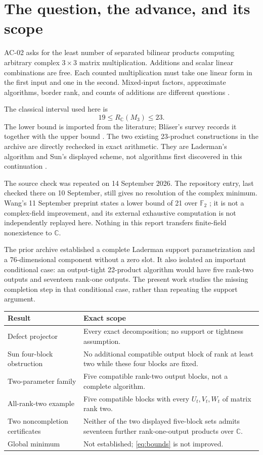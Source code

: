 \documentclass[11pt]{article}
\theoremstyle{definition}\newtheorem{definition}[theorem]{Definition}
\newcommand{\C}{\mathbb C}\newcommand{\Q}{\mathbb Q}
\begin{document}
\section{The question, the advance, and its scope}
AC-02 asks for the least number of separated bilinear products computing arbitrary complex $3\times3$ matrix multiplication. Additions and scalar linear combinations are free. Each counted multiplication must take one linear form in the first input and one in the second. Mixed-input factors, approximate algorithms, border rank, and counts of additions are different questions \cite{repo}.

The classical interval used here is
\begin{equation}\label{eq:bounds}
19\le R_{\C}(M_3)\le23.
\end{equation}
The lower bound is imported from the literature; Bl\"aser's survey records it together with the upper bound \cite{blaeser}. The two existing 23-product constructions in the archive are directly rechecked in exact arithmetic. They are Laderman's algorithm and Sun's displayed scheme, not algorithms first discovered in this continuation \cite{laderman,sun}.

The source check was repeated on 14 September 2026. The repository entry, last checked there on 10 September, still gives no resolution of the complex minimum. Wang's 11 September preprint states a lower bound of 21 over $\mathbb F_2$ \cite{wang21}; it is not a complex-field improvement, and its external exhaustive computation is not independently replayed here. Nothing in this report transfers finite-field nonexistence to $\C$.

The prior archive established a complete Laderman support parametrization and a 76-dimensional component without a zero slot. It also isolated an important conditional case: an output-tight 22-product algorithm would have five rank-two outputs and seventeen rank-one outputs. The present work studies the missing completion step in that conditional case, rather than repeating the support argument.

\begin{center}
\begin{tabularx}{\textwidth}{@{}lX@{}}\toprule
Result & Exact scope \\\midrule
Defect projector & Every exact decomposition; no support or tightness assumption.\\
Sun four-block obstruction & No additional compatible output block of rank at least two while these four blocks are fixed.\\
Two-parameter family & Five compatible rank-two output blocks, not a complete algorithm.\\
All-rank-two example & Five compatible blocks with every $U_t,V_t,W_t$ of matrix rank two.\\
Two noncompletion certificates & Neither of the two displayed five-block sets admits seventeen further rank-one-output products over $\C$.\\
Global minimum & Not established; \eqref{eq:bounds} is not improved.\\\bottomrule
\end{tabularx}
\end{center}
\end{document}
